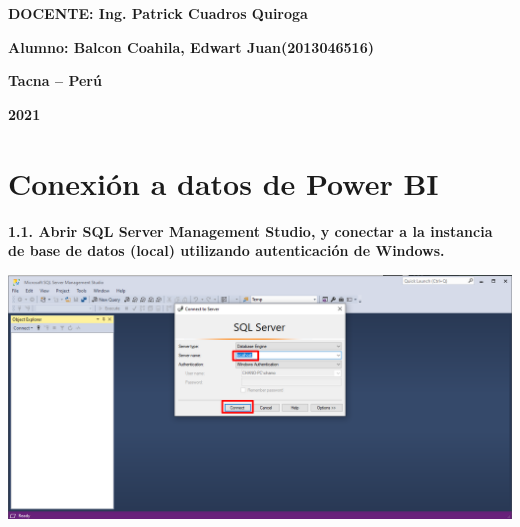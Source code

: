 \documentclass{article}
\begin{document}
\begin{titlepage}
\begin{center}
\vspace*{0.3in}
\begin{Large}
\textbf{DOCENTE: Ing. Patrick Cuadros Quiroga} \\
\end{Large}

\vspace*{0.2in}
\vspace*{0.1in}
\begin{large}

\begin{Large}
\textbf{Alumno: Balcon Coahila, Edwart Juan\hfill	(2013046516) } \\
\end{Large}

\vspace*{0.15in}
\begin{Large}
\textbf{Tacna – Perú} \\
\end{Large}

\vspace*{0.05in}
\begin{Large}
\textbf{2021 } \\
\end{Large}

\end{large}
\end{center}

\end{titlepage}


\newpage

\section{Conexión a datos de Power BI}

\textbf{1.1. Abrir SQL Server Management Studio, y conectar a la instancia de base de
 datos \textbf{(local)} utilizando autenticación de Windows.}

    \begin{center}
		\includegraphics[width=14cm]{./images/1} 
	\end{center}
\end{document}
